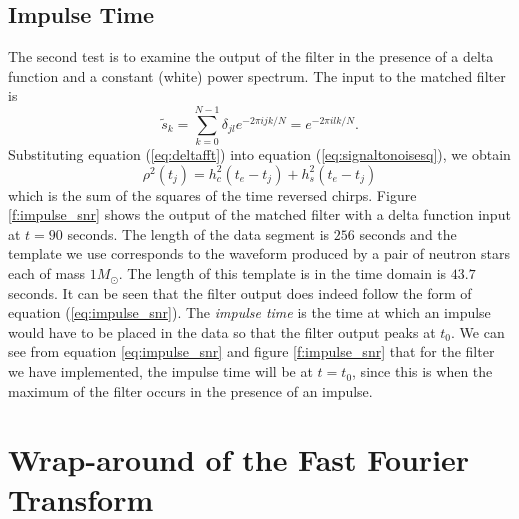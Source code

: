\subsection{Impulse Time}
\label{ss:impulsetime}

The second test is to examine the output of the filter in the presence of a
delta function and a constant (white) power spectrum. The input to the matched
filter is
\begin{equation}
\tilde{s}_k = \sum_{k=0}^{N-1} \delta_{jl} e^{-2\pi ijk/N} = e^{-2\pi ilk/N}.
\label{eq:deltafft}
\end{equation}
Substituting equation (\ref{eq:deltafft}) into equation 
(\ref{eq:signaltonoisesq}), we obtain
\begin{equation}
\rho^2(t_j) = h_c^2(t_e - t_j) + h_s^2(t_e - t_j)
\label{eq:impulse_snr}
\end{equation}
which is the sum of the squares of the time reversed chirps.  Figure
\ref{f:impulse_snr} shows the output of the matched filter with a delta
function input at $t=90$ seconds. The length of the data segment is $256$
seconds and the template we use corresponds to the waveform produced by a pair
of neutron stars each of mass $1 M_\odot$. The length of this template is in
the time domain is $43.7$ seconds.  It can be seen that the filter output does
indeed follow the form of equation (\ref{eq:impulse_snr}). The \emph{impulse
time} is the time at which an impulse would have to be placed in the data so
that the filter output peaks at $t_0$. We can see from equation
\ref{eq:impulse_snr} and figure \ref{f:impulse_snr} that for the filter we
have implemented, the impulse time will be at $t = t_0$, since this is when
the maximum of the filter occurs in the presence of an impulse.

\section{Wrap-around of the Fast Fourier Transform}
\label{s:wraparound}


